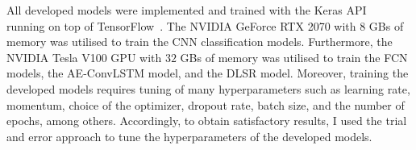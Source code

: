 All developed models were implemented and trained with the Keras API~\cite{chollet2015keras} running on top of TensorFlow~\cite{Abadi2016}.
The NVIDIA GeForce RTX 2070 with \(8\) GBs of memory was utilised to train the CNN classification models.
Furthermore, the NVIDIA Tesla V100 GPU with \(32\) GBs of memory was utilised to train the FCN models, the AE-ConvLSTM model, and the DLSR model.
Moreover, training the developed models requires tuning of many hyperparameters such as learning rate, momentum, choice of the optimizer, dropout rate, batch size, and the number of epochs, among others.
Accordingly, to obtain satisfactory results, I used the trial and error approach to tune the hyperparameters of the developed models.







